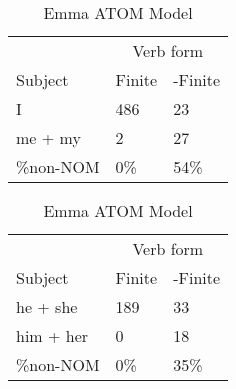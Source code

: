 \begin{table}[]
\caption{Emma ATOM Model}
\begin{minipage}{0.5\textwidth}
    \centering
    \begin{tabular}{@{}lll@{}}
        \toprule
         & \multicolumn{2}{c}{Verb form}\\
         \cline{2-3}
        Subject & Finite & -Finite \\
        \midrule
        I & 486 & 23 \\
        me + my & 2 & 27 \\
        \hline
        \%non-NOM & 0\% & 54\% \\
        \bottomrule
    \end{tabular}
\end{minipage}
\begin{minipage}{0.5\textwidth}
    \centering
    \begin{tabular}{@{}lll@{}}
        \toprule
         & \multicolumn{2}{c}{Verb form}\\
         \cline{2-3}
        Subject & Finite & -Finite \\
        \midrule
        he + she & 189 & 33 \\
        him + her & 0 & 18 \\
        \hline
        \%non-NOM & 0\% & 35\% \\
        \bottomrule
    \end{tabular}
    \end{minipage}


\end{table}
